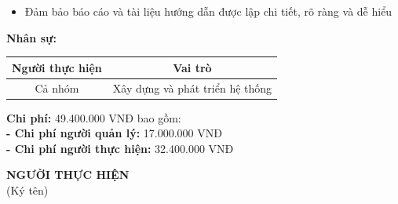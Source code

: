 {\begin{minipage}{\textwidth}
\begin{itemize}
            \item Đảm bảo báo cáo và tài liệu hướng dẫn được lập chi tiết, rõ ràng và dễ hiểu
        \end{itemize}
        \noindent \textbf{Nhân sự:}
        \begin{longtable}{|c|c|}
        \hline
        \textbf{Người thực hiện} & \textbf{Vai trò} \\
        \hline
        Cả nhóm & Xây dựng và phát triển hệ thống \\
        \hline
        \end{longtable}
        \noindent \textbf{Chi phí:} 49.400.000 VNĐ bao gồm:\\
        \noindent \textbf{  - Chi phí người quản lý:} 17.000.000 VNĐ \\
        \noindent \textbf{  - Chi phí người thực hiện:} 32.400.000 VNĐ
        \vspace{1cm}
        \begin{flushleft}
            \hspace{8cm} \textbf{NGƯỜI THỰC HIỆN} \\
            \hspace{9.5cm} (Ký tên) \\
            \vspace{1cm}
        \end{flushleft}
	\end{minipage}
}    
